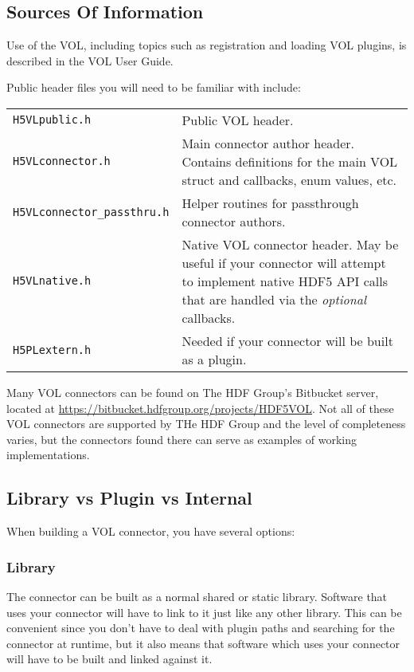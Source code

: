 \subsection{Sources Of Information}

Use of the VOL, including topics such as registration and loading VOL plugins, is
described in the VOL User Guide.

Public header files you will need to be familiar with include:

\begin{tabularx}{\linewidth}{ l X }
  \texttt{H5VLpublic.h} & Public VOL header.\\
  \texttt{H5VLconnector.h} & Main connector author header. Contains definitions for the main VOL struct and callbacks, enum values, etc.\\
  \texttt{H5VLconnector\_passthru.h} & Helper routines for passthrough connector authors.\\
    \texttt{H5VLnative.h} & Native VOL connector header. May be useful if your connector will attempt to implement native HDF5 API calls that are handled via the \textit{optional} callbacks.\\
  \texttt{H5PLextern.h} & Needed if your connector will be built as a plugin.\\
\end{tabularx}

Many VOL connectors can be found on The HDF Group's Bitbucket server, located at
\url{https://bitbucket.hdfgroup.org/projects/HDF5VOL}. Not all of these VOL
connectors are supported by THe HDF Group and the level of completeness varies,
but the connectors found there can serve as examples of working implementations.


\subsection{Library vs Plugin vs Internal}

When building a VOL connector, you have several options:

\subsubsection*{Library}

The connector can be built as a normal shared or static library. Software that
uses your connector will have to link to it just like any other library. This
can be convenient since you don't have to deal with plugin paths and searching
for the connector at runtime, but it also means that software which uses
your connector will have to be built and linked against it.

